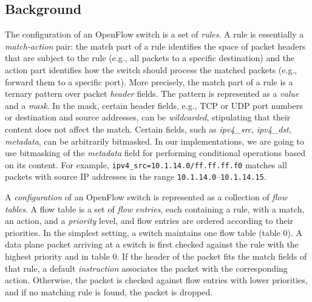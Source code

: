 \documentclass[conference]{sigcomm-alternate}
\newcommand{\liron}[1]{\textit{\textcolor{mygreen}{[liron]: #1}}} %
\begin{document}
\subsection{Background}

The configuration of an OpenFlow switch is a set of
\emph{rules}.
A rule is essentially a \emph{match-action} pair:
the match part of a rule identifies the space of packet headers that are
subject to the rule (e.g., all packets to a specific destination) and
the action part identifies how the switch should process the matched
packets (e.g., forward them to a specific port).
More precisely, the match part of a rule is
a ternary pattern over packet \emph{header} fields.
The pattern is represented as a \emph{value} and a \emph{mask}.
In the mask, certain header fields, e.g., TCP or UDP port numbers or destination and source
addresses, can be \emph{wildcarded}, stipulating that their content does
not affect the match.
Certain fields, such as \emph{ipv4\_src}, \emph{ipv4\_dst}, \emph{metadata}, can be arbitrarily
bitmasked.
In our implementations, we are going to use bitmasking of the \emph{metadata}
field for performing conditional operations based on  its content.
For example, \texttt{ipv4\_src=10.1.14.0/ff.ff.ff.f0} matches all packets
with source IP addresses in the range \texttt{10.1.14.0}--\texttt{10.1.14.15}.

A \emph{configuration} of an OpenFlow switch is represented as a
collection of \emph{flow tables}.
A flow table is a set of \emph{flow entries}, each containing a rule,
with a match, an action, and a \emph{priority} level, and flow entries
are ordered according to their priorities.
In the simplest setting, a switch maintains one flow table (table 0).
A data plane packet arriving at a switch is first checked against
the rule with the highest priority and in table $0$.
If the header of the packet fits the match fields of that rule,
a default \emph{instruction} associates the packet with the corresponding action.
Otherwise, the packet is checked against flow  entries with lower
priorities, and if no matching rule is found, the packet is dropped.
\end{document}
